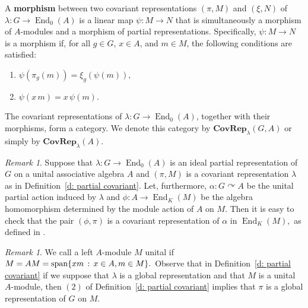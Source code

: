 \documentclass[11pt]{amsart}
\numberwithin{equation}{section}
\theoremstyle{definition}
\theoremstyle{remark}
\newtheorem{remark}[theorem]{Remark}
\newcommand*{\en}{\operatorname{End}}
\begin{document}
A \textbf{morphism} between two covariant representations $(\pi, M)$ and $(\xi, N)$ of $\lambda: G \to \operatorname{End}_0(A)$ is a linear map $\psi: M \to N$ that is simultaneously a morphism of  $A$-modules and a morphism of partial representations. Specifically, $\psi: M \to N$ is a morphism if, for all $g \in G$, $x \in A$, and $m \in M$, the following conditions are satisfied:
\begin{enumerate}
    \item $\psi(\pi_g(m)) = \xi_g(\psi(m)),$
    \item $\psi(x\,  m) = x\,  \psi(m).$
\end{enumerate}
The covariant representations of $\lambda: G\to \en_0(A)$, together with  their morphisms, form a category.  We denote this category by \(\textbf{CovRep}_{\lambda}(G, A)\) or simply by
\(\textbf{CovRep}_{\lambda}(A)\).

    \begin{remark}
             Suppose that $\lambda: G \to \operatorname{End}_0(A)$ is  an ideal partial representation of $G$ on a unital associative algebra $A$ and $(\pi, M)$ is a covariant representation  $\lambda $ as in De\-fi\-ni\-tion~\ref{d: partial covariant}. Let, furthermore,  $\alpha: G \curvearrowright A $ be the unital partial action  induced by \(\lambda \) and  $\phi : A \to \en _K (M)$ be the algebra homomorphism determined by the module action of $A$ on $M.$ Then it is easy to check that the pair $(\phi , \pi)  $ 
is a covariant representation of $\alpha $ in $\en _K (M),$ as defined in \cite[Definition 9.10]{Book_Exel_2017_PDSFBAA}.
    \end{remark}
    
    
      
    
    \begin{remark}
    We call a left $A$-module $M$  unital  if $M= AM  = {\rm span} \{xm \, : \, x\in A, m \in M \}.$ 
        Observe that in Definition~\ref{d: partial covariant} if we suppose that \(\lambda\) is a global representation and that \(M\) is a  unital \(A\)-module, then \((2)\) of Definition~\ref{d: partial covariant} implies that \(\pi\) is a global representation of \(G\) on \(M\).
    \end{remark}
\end{document}
